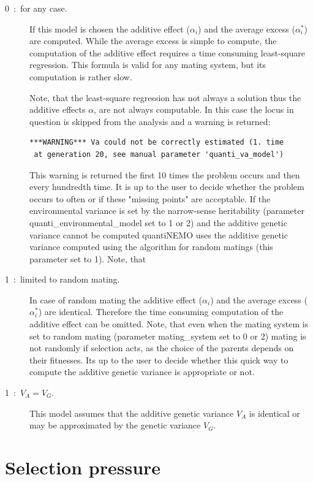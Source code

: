 \documentclass[letterpaper,12pt,oneside]{book}
\begin{document}
\begin{description}
\begin{description}
\item [0~:~for any case.] If this model is chosen the additive effect ($\alpha_{i}$) and the average excess ($\alpha_{i}^{*}$) are computed. While the average excess is simple to compute, the computation of the additive effect requires a time consuming least-square regression. This formula is valid for any mating system, but its computation is rather slow. 

Note, that the least-square regression has not always a solution thus the additive effects $\alpha$, are not always computable. In this case the locus in question is skipped from the analysis and a warning is returned:
\begin{lstlisting}[frame=single]
***WARNING*** Va could not be correctly estimated (1. time
 at generation 20, see manual parameter 'quanti_va_model')
\end{lstlisting}

This warning is returned the first 10 times the problem occurs and then every hundredth time. It is up to the user to decide whether the problem occurs to often or if these "missing points" are acceptable. If the environmental variance is set by the narrow-sense heritability (parameter \textsf{quanti\_environmental\_model} set to 1 or 2) and the additive genetic variance cannot be computed quantiNEMO uses the additive genetic variance computed using the algorithm for random matings (this parameter set to 1). Note, that  

 
\item [1~:~limited to random mating.] In case of random mating the additive effect ($\alpha_{i}$) and the average excess ($\alpha_{i}^{*}$) are identical. Therefore the time consuming computation of the additive effect can be omitted. Note, that even when the mating system is set to random mating (parameter \textsf{mating\_system} set to 0 or 2) mating is not randomly if selection acts, as the choice of the parents depends on their fitnesses. Its up to the user to decide whether this quick way to compute the additive genetic variance is appropriate or not.  

\item [1~:~$V_{A} = V_{G}$.] This model assumes that the additive genetic variance $V_{A}$ is identical or may be approximated by the genetic variance $V_{G}$. 
\end{description}
\end{description}

\section{Selection pressure}\label{selPressure2}
\end{document}
